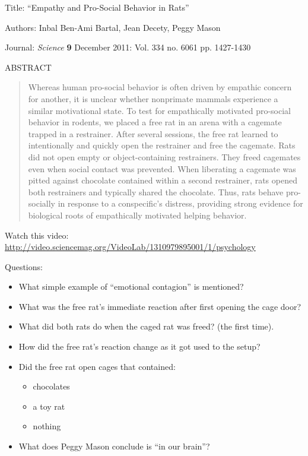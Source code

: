 \def\theTopic{Reading 5}

Title:  ``Empathy and Pro-Social Behavior in Rats''

Authors: Inbal Ben-Ami Bartal, Jean Decety, Peggy Mason

Journal: {\it Science} {\bf 9} December 2011: Vol. 334 no. 6061 pp. 1427-1430 


ABSTRACT\\
\begin{quotation}
  Whereas human pro-social behavior is often driven by empathic concern
for another, it is unclear whether nonprimate mammals experience a
similar motivational state. To test for empathically motivated
pro-social behavior in rodents, we placed a free rat in an arena with
a cagemate trapped in a restrainer. After several sessions, the free
rat learned to intentionally and quickly open the restrainer and free
the cagemate. Rats did not open empty or object-containing
restrainers. They freed cagemates even when social contact was
prevented. When liberating a cagemate was pitted against chocolate
contained within a second restrainer, rats opened both restrainers and
typically shared the chocolate. Thus, rats behave pro-socially in
response to a conspecific’s distress, providing strong evidence for
biological roots of empathically motivated helping behavior. 


\end{quotation}

\newpage

Watch this video:\\
\url{http://video.sciencemag.org/VideoLab/1310979895001/1/psychology}\vfill

Questions:
\begin{itemize}
\item What simple example of ``emotional contagion'' is mentioned? \vfill
\item What was the free rat's immediate reaction after first opening
  the cage door?  \vfill
\item What did both rats do when the caged rat was freed? (the first
  time). \vfill
\item How did the free rat's reaction change as it got used to the
  setup?  \vfill
\item Did the free rat open cages that contained:
  \begin{itemize}
  \item chocolates
  \item a toy rat
  \item nothing \vfill
  \end{itemize}
\item What does Peggy Mason conclude is ``in our brain''?\vspace*{\fill}
\end{itemize}